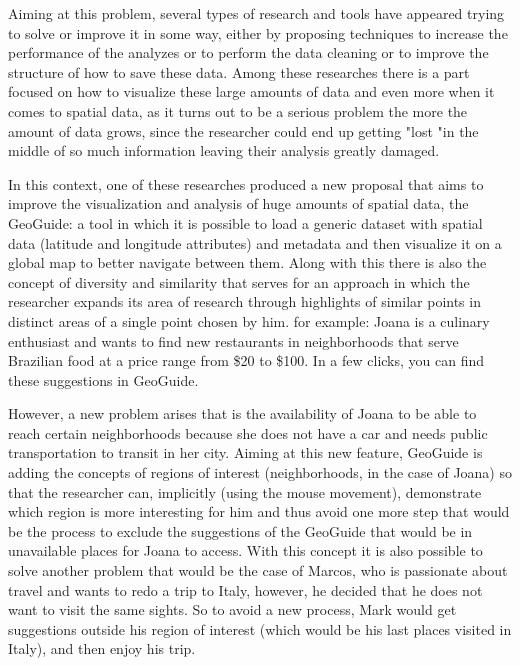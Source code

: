 \noindent\makebox[\linewidth]{\rule{\paperwidth}{0.4pt}}

Aiming at this problem, several types of research and tools have appeared trying to
solve or improve it in some way, either by proposing techniques to increase
the performance of the analyzes or to perform the data cleaning or to improve the
structure of how to save these data. Among these researches there is a part focused
on how to visualize these large amounts of data and even more when it comes to
spatial data, as it turns out to be a serious problem the more the amount of data
grows, since the researcher could end up getting "lost "in the middle of so much
information leaving their analysis greatly damaged.

In this context, one of these researches produced a new proposal that aims to
improve the visualization and analysis of huge amounts of spatial data, the
GeoGuide: a tool in which it is possible to load a generic dataset with spatial
data (latitude and longitude attributes) and metadata and then visualize it on a
global map to better navigate between them. Along with this there is also the
concept of diversity and similarity that serves for an approach in which the
researcher expands its area of research through highlights of similar points in
distinct areas of a single point chosen by him. for example: Joana is a culinary
enthusiast and wants to find new restaurants in neighborhoods that serve Brazilian
food at a price range from \$20 to \$100. In a few clicks, you can find these
suggestions in GeoGuide.

However, a new problem arises that is the availability of Joana to be able to
reach certain neighborhoods because she does not have a car and needs public
transportation to transit in her city. Aiming at this new feature, GeoGuide is
adding the concepts of regions of interest (neighborhoods, in the case of Joana)
so that the researcher can, implicitly (using the mouse movement), demonstrate
which region is more interesting for him and thus avoid one more step that would
be the process to exclude the suggestions of the GeoGuide that would be in unavailable
places for Joana to access. With this concept it is also possible to solve another
problem that would be the case of Marcos, who is passionate about travel and wants
to redo a trip to Italy, however, he decided that he does not want to visit the
same sights. So to avoid a new process, Mark would get suggestions outside his
region of interest (which would be his last places visited in Italy), and then
enjoy his trip.


